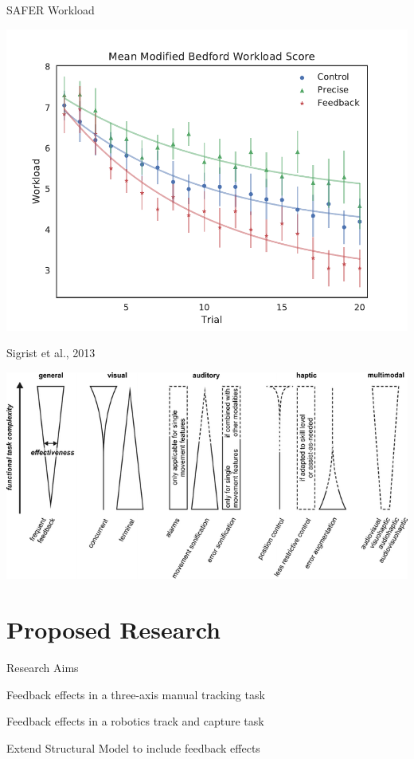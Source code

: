 \documentclass[10pt]{beamer}
\begin{document}
\begin{frame}[fragile]{SAFER Workload}
  \begin{center}
    \includegraphics[width=\textwidth]{../img/Group_Workload_fit_30.pdf}
  \end{center}
\end{frame}

\begin{frame}[fragile]{Sigrist et al., 2013~\cite{Sigrist2013}}
  \begin{center}
    \includegraphics[width=\textwidth]{../img/sigrist.png}
  \end{center}
\end{frame}

\section{Proposed Research}

\begin{frame}[fragile]{Research Aims}
  \begin{description}[align=right]
    \setlength\itemsep{1em}
    \item [Aim One] Feedback effects in a three-axis manual tracking task
    \item [Aim Two] Feedback effects in a robotics track and capture task
    \item [Aim Three] Extend Structural Model to include feedback effects
  \end{description}
\end{frame}
\end{document}
